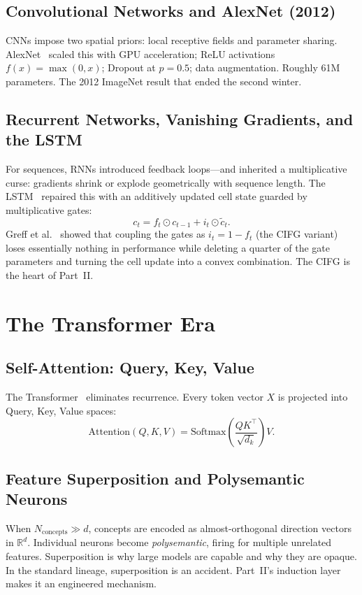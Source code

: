 \documentclass[11pt,letterpaper]{article}
\begin{document}
\subsection{Convolutional Networks and AlexNet (2012)}

CNNs impose two spatial priors: local receptive fields and parameter sharing.
AlexNet~\cite{krizhevsky2012} scaled this with GPU acceleration; ReLU
activations $f(x) = \max(0,x)$; Dropout at $p=0.5$; data augmentation.
Roughly 61M parameters.  The 2012 ImageNet result that ended the second winter.

\subsection{Recurrent Networks, Vanishing Gradients, and the LSTM}

For sequences, RNNs introduced feedback loops---and inherited a multiplicative
curse: gradients shrink or explode geometrically with sequence length.  The
LSTM~\cite{hochreiter1997} repaired this with an additively updated cell state
guarded by multiplicative gates:
\[
c_t = f_t \odot c_{t-1} + i_t \odot \tilde{c}_t.
\]
Greff et al.~\cite{greff2017} showed that coupling the gates as $i_t = 1 - f_t$
(the CIFG variant) loses essentially nothing in performance while deleting a
quarter of the gate parameters and turning the cell update into a convex
combination.  The CIFG is the heart of Part~II.

\section{The Transformer Era}

\subsection{Self-Attention: Query, Key, Value}

The Transformer~\cite{vaswani2017} eliminates recurrence.  Every token vector
$X$ is projected into Query, Key, Value spaces:
\[
\mathrm{Attention}(Q,K,V) = \mathrm{Softmax}\!\left(\frac{QK^\top}{\sqrt{d_k}}\right)V.
\]

\subsection{Feature Superposition and Polysemantic Neurons}

When $N_{\text{concepts}} \gg d$, concepts are encoded as almost-orthogonal
direction vectors in $\mathbb{R}^d$.  Individual neurons become
\textit{polysemantic}, firing for multiple unrelated features.  Superposition is
why large models are capable and why they are opaque.  In the standard lineage,
superposition is an accident.  Part~II's induction layer makes it an engineered
mechanism.
\end{document}
